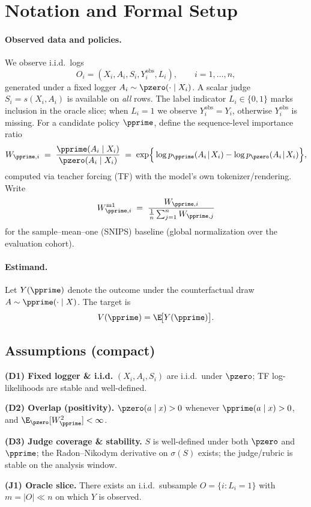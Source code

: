 \section{Notation and Formal Setup}
\label{app:notation}

\paragraph{Observed data and policies.}
We observe i.i.d.\ logs
\[
O_i=(X_i,A_i,S_i,Y^{\mathrm{obs}}_i,L_i),\qquad i=1,\dots,n,
\]
generated under a fixed logger $A_i\sim \pzero(\cdot\mid X_i)$. A scalar judge
$S_i=s(X_i,A_i)$ is available on \emph{all} rows. The label indicator $L_i\in\{0,1\}$ marks inclusion in the oracle slice; when $L_i=1$ we observe $Y^{\mathrm{obs}}_i=Y_i$, otherwise $Y^{\mathrm{obs}}_i$ is missing.
For a candidate policy $\pprime$, define the sequence-level importance ratio
\[
W_{\pprime,i}
\;=\;
\frac{\pprime(A_i\mid X_i)}{\pzero(A_i\mid X_i)}
\;=\;
\exp\!\Big\{\log p_{\pprime}(A_i\!\mid\!X_i)-\log p_{\pzero}(A_i\!\mid\!X_i)\Big\},
\]
computed via teacher forcing (TF) with the model’s own tokenizer/rendering. Write
\[
W^{\mathrm{m1}}_{\pprime,i}
\;=\;
\frac{W_{\pprime,i}}{\tfrac{1}{n}\sum_{j=1}^n W_{\pprime,j}}
\]
for the sample–mean–one (SNIPS) baseline (global normalization over the evaluation cohort).

\paragraph{Estimand.}
Let $Y(\pprime)$ denote the outcome under the counterfactual draw $A\sim \pprime(\cdot\mid X)$.
The target is
\[
V(\pprime)=\E\!\big[Y(\pprime)\big].
\]

\subsection{Assumptions (compact)}
\label{app:assumptions}
\textbf{(D1) Fixed logger \& i.i.d.} $(X_i,A_i,S_i)$ are i.i.d.\ under $\pzero$; TF log-likelihoods are stable and well-defined.

\noindent\textbf{(D2) Overlap (positivity).} $\pzero(a\mid x)>0$ whenever $\pprime(a\mid x)>0$, and $\E_{\pzero}[W_{\pprime}^2]<\infty$.

\noindent\textbf{(D3) Judge coverage \& stability.} $S$ is well-defined under both $\pzero$ and $\pprime$; the Radon–Nikodym derivative on $\sigma(S)$ exists; the judge/rubric is stable on the analysis window.

\noindent\textbf{(J1) Oracle slice.} There exists an i.i.d.\ subsample $O=\{i:L_i=1\}$ with $m=|O|\ll n$ on which $Y$ is observed.

